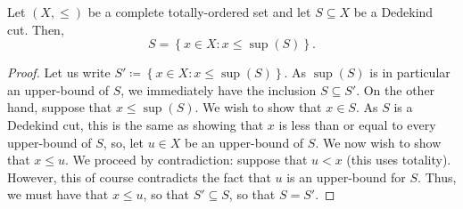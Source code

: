 \begin{prp}
Let $(X,\leq )$ be a complete totally-ordered set and let $S\subseteq X$ be a Dedekind cut.  Then,
\begin{equation}
S=\left\{ x\in X:x\leq \sup (S)\right\} .
\end{equation}
\begin{proof}
Let us write $S'\coloneqq \left\{ x\in X:x\leq \sup (S)\right\}$.  As $\sup (S)$ is in particular an upper-bound of $S$, we immediately have the inclusion $S\subseteq S'$.  On the other hand, suppose that $x\leq \sup (S)$.  We wish to show that $x\in S$.  As $S$ is a Dedekind cut, this is the same as showing that $x$ is less than or equal to every upper-bound of $S$, so, let $u\in X$ be an upper-bound of $S$.  We now wish to show that $x\leq u$.  We proceed by contradiction:  suppose that $u<x$ (this uses totality).  However, this of course contradicts the fact that $u$ is an upper-bound for $S$.  Thus, we must have that $x\leq u$, so that $S'\subseteq S$, so that $S=S'$.
\end{proof}
\end{prp}

